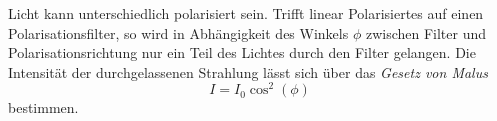 Licht kann unterschiedlich polarisiert sein. Trifft linear Polarisiertes auf einen Polarisationsfilter, so wird in Abhängigkeit des Winkels $\phi$ zwischen Filter und Polarisationsrichtung nur ein Teil des Lichtes durch den Filter gelangen. Die Intensität der durchgelassenen Strahlung lässt sich über das \textit{Gesetz von Malus}
\begin{equation}
    \label{eqn:pol}
    I = I_0\cos^2{(\phi)}
\end{equation}
bestimmen.


